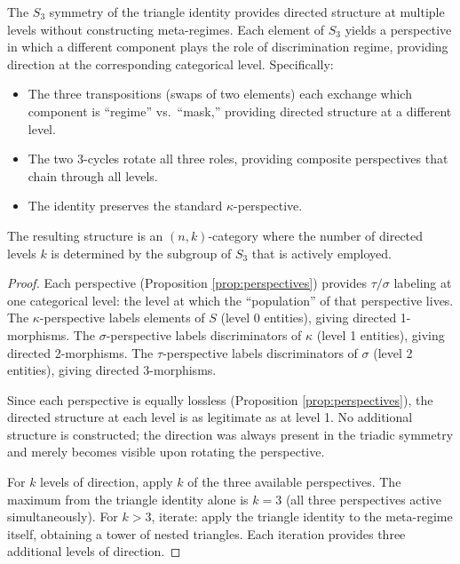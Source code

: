 \begin{theorem}\label{thm:nk-free}
The $S_3$ symmetry of the triangle identity provides
directed structure at multiple levels without constructing
meta-regimes. Each element of $S_3$ yields a perspective
in which a different component plays the role of
discrimination regime, providing direction at the
corresponding categorical level. Specifically:
\begin{itemize}[nosep]
  \item The three transpositions (swaps of two elements)
    each exchange which component is ``regime'' vs.\
    ``mask,'' providing directed structure at a
    different level.
  \item The two 3-cycles rotate all three roles, providing
    composite perspectives that chain through all levels.
  \item The identity preserves the standard $\kappa$-perspective.
\end{itemize}
The resulting structure is an $(n,k)$-category where the
number of directed levels $k$ is determined by the
subgroup of $S_3$ that is actively employed.
\end{theorem}

\begin{proof}
Each perspective (Proposition \ref{prop:perspectives})
provides $\tau/\sigma$ labeling at one categorical level:
the level at which the ``population'' of that perspective
lives. The $\kappa$-perspective labels elements of $S$
(level 0 entities), giving directed 1-morphisms. The
$\sigma$-perspective labels discriminators of $\kappa$
(level 1 entities), giving directed 2-morphisms. The
$\tau$-perspective labels discriminators of $\sigma$
(level 2 entities), giving directed 3-morphisms.

Since each perspective is equally lossless (Proposition
\ref{prop:perspectives}), the directed structure at each
level is as legitimate as at level 1. No additional
structure is constructed; the direction was always present
in the triadic symmetry and merely becomes visible upon
rotating the perspective.

For $k$ levels of direction, apply $k$ of the three
available perspectives. The maximum from the triangle
identity alone is $k = 3$ (all three perspectives active
simultaneously). For $k > 3$, iterate: apply the triangle
identity to the meta-regime itself, obtaining a tower of
nested triangles. Each iteration provides three additional
levels of direction.
\end{proof}

